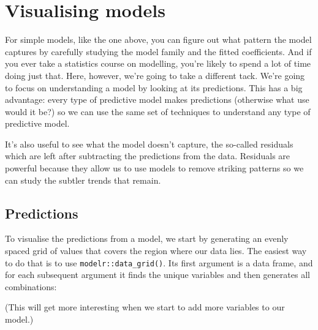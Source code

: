 \documentclass[]{book}
\newenvironment{Shaded}{\begin{snugshade}}{\end{snugshade}}
\newcommand{\KeywordTok}[1]{\textcolor[rgb]{0.13,0.29,0.53}{\textbf{{#1}}}}
\newcommand{\StringTok}[1]{\textcolor[rgb]{0.31,0.60,0.02}{{#1}}}
\newcommand{\CommentTok}[1]{\textcolor[rgb]{0.56,0.35,0.01}{\textit{{#1}}}}
\newcommand{\NormalTok}[1]{{#1}}
\begin{document}
\section{Visualising models}\label{visualising-models}

For simple models, like the one above, you can figure out what pattern
the model captures by carefully studying the model family and the fitted
coefficients. And if you ever take a statistics course on modelling,
you're likely to spend a lot of time doing just that. Here, however,
we're going to take a different tack. We're going to focus on
understanding a model by looking at its predictions. This has a big
advantage: every type of predictive model makes predictions (otherwise
what use would it be?) so we can use the same set of techniques to
understand any type of predictive model.

It's also useful to see what the model doesn't capture, the so-called
residuals which are left after subtracting the predictions from the
data. Residuals are powerful because they allow us to use models to
remove striking patterns so we can study the subtler trends that remain.

\subsection{Predictions}\label{predictions}

To visualise the predictions from a model, we start by generating an
evenly spaced grid of values that covers the region where our data lies.
The easiest way to do that is to use \texttt{modelr::data\_grid()}. Its
first argument is a data frame, and for each subsequent argument it
finds the unique variables and then generates all combinations:

\begin{Shaded}
\end{Shaded}

(This will get more interesting when we start to add more variables to
our model.)
\end{document}
